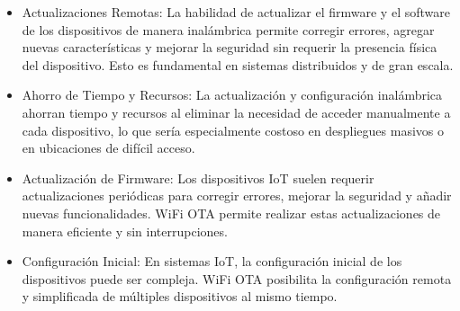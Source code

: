 \begin{appendixd}
    \begin{itemize}
        \item Actualizaciones Remotas: La habilidad de actualizar el firmware y el
              software de los dispositivos de manera inalámbrica permite corregir
              errores, agregar nuevas características y mejorar la seguridad sin requerir
              la presencia física del dispositivo. Esto es fundamental en sistemas
              distribuidos y de gran escala.
        \item Ahorro de Tiempo y Recursos: La actualización y configuración inalámbrica
              ahorran tiempo y recursos al eliminar la necesidad de acceder manualmente a
              cada dispositivo, lo que sería especialmente costoso en despliegues masivos
              o en ubicaciones de difícil acceso.
        \item Actualización de Firmware: Los dispositivos IoT suelen requerir
              actualizaciones periódicas para corregir errores, mejorar la seguridad y
              añadir nuevas funcionalidades. WiFi OTA permite realizar estas
              actualizaciones de manera eficiente y sin interrupciones.
        \item Configuración Inicial: En sistemas IoT, la configuración inicial de los
              dispositivos puede ser compleja. WiFi OTA posibilita la configuración
              remota y simplificada de múltiples dispositivos al mismo tiempo.
    \end{itemize}
\end{appendixd}
